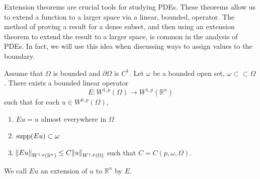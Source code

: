 \documentclass[10pt]{article}
\begin{document}
Extension theorems are crucial tools for studying PDEs. These theorems allow us to extend a function to a larger space via a linear, bounded, operator. The method of proving a result for a dense subset, and then using an extension theorem to extend the result to a larger space, is common in the analysis of PDEs. In fact, we will use this idea when discussing ways to assign values to the boundary. 
\begin{theorem}
	Assume that $\Omega$ is bounded and $\partial \Omega$ is $C^1$. Let $\omega$ be a bounded open set, $\omega \subset \subset \Omega$. There exists a bounded linear operator 
	\begin{equation*}
		\displaystyle E: W^{1,p}(\Omega) \to W^{1,p}(\mathbb{R}^n)
	\end{equation*}
	such that for each $u \in W^{k,p}(\Omega)$,
	\begin{enumerate}
		\item $Eu = u$ almost everywhere in $\Omega$
		\item $\operatorname{supp}(Eu) \subset \omega$
		\item $\norm{Eu}_{W^{1,p}(\mathbb{R}^n)} \leq C\norm{u}_{W^{1,p}(\Omega)}$ such that $C = C(p,\omega,\Omega)$. 
	\end{enumerate}
	We call $Eu$ an extension of $u$ to $\mathbb{R}^n$ by $E$. 
\end{theorem}
\end{document}
